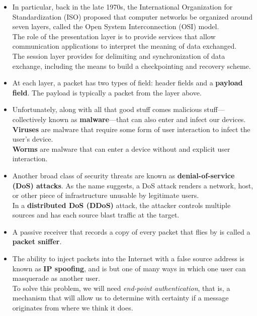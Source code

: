 \begin{itemize}
\item
In particular, back in the late 1970s, the International Organization for Standardization (ISO) proposed that computer networks be organized around seven layers, called the Open System Interconnection (OSI) model.\\
The role of the presentation layer is to provide services that allow communication applications to interpret the meaning of data exchanged.\\
The session layer provides for delimiting and synchronization of data exchange, including the means to build a checkpointing and recovery scheme.

\item
At each layer, a packet has two types of field: header fields and a \textbf{payload field}. The payload is typically a packet from the layer above.

\item
Unfortunately, along with all that good stuff comes malicious stuff---collectively known as \textbf{malware}---that can also enter and infect our devices.\\
\textbf{Viruses} are malware that require some form of user interaction to infect the user's device.\\
\textbf{Worms} are malware that can enter a device without and explicit user interaction.

\item
Another broad class of security threats are known as \textbf{denial-of-service (DoS) attacks}. As the name suggests, a DoS attack renders a network, host, or other piece of infrastructure unusable by legitimate users.\\
In a \textbf{distributed DoS (DDoS)} attack, the attacker controls multiple sources and has each source blast traffic at the target.

\item
A passive receiver that records a copy of every packet that flies by is called a \textbf{packet sniffer}.

\item
The ability to inject packets into the Internet with a false source address is known as \textbf{IP spoofing}, and is but one of many ways in which one user can masquerade as another user.\\
To solve this problem, we will need \textit{end-point authentication}, that is, a mechanism that will allow us to determine with certainty if a message originates from where we think it does.

\end{itemize}